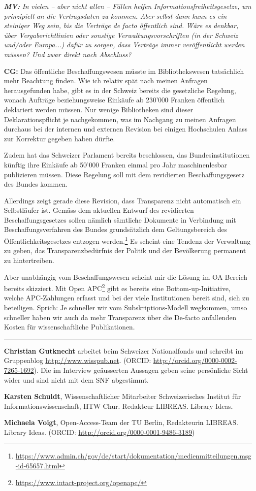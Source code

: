 \documentclass[a4paper,
fontsize=11pt,
oneside,
numbers=noperiodatend,
parskip=half-,
bibliography=totoc,
final
]{scrartcl}
\begin{document}
\emph{\textbf{MV:} In vielen -- aber nicht allen -- Fällen helfen
Informationsfreiheitsgesetze, um prinzipiell an die Vertragsdaten zu
kommen. Aber selbst dann kann es ein steiniger Weg sein, bis die
Verträge de facto öffentlich sind. Wäre es denkbar, über
Vergaberichtlinien oder sonstige Verwaltungsvorschriften (in der Schweiz
und/oder Europa...) dafür zu sorgen, dass Verträge immer veröffentlicht
werden müssen? Und zwar direkt nach Abschluss?}

\textbf{CG:} Das öffentliche Beschaffungswesen müsste im
Bibliothekswesen tatsächlich mehr Beachtung finden. Wie ich relativ spät
nach meinen Anfragen herausgefunden habe, gibt es in der Schweiz bereits
die gesetzliche Regelung, wonach Aufträge beziehungsweise Einkäufe ab
230'000 Franken öffentlich deklariert werden müssen. Nur wenige
Bibliotheken sind dieser Deklarationspflicht je nachgekommen, was im
Nachgang zu meinen Anfragen durchaus bei der internen und externen
Revision bei einigen Hochschulen Anlass zur Korrektur gegeben haben
dürfte.

Zudem hat das Schweizer Parlament bereits beschlossen, das
Bundesinstitutionen künftig ihre Einkäufe ab 50'000 Franken einmal pro
Jahr maschinenlesbar publizieren müssen. Diese Regelung soll mit dem
revidierten Beschaffungsgesetz des Bundes kommen.

Allerdings zeigt gerade diese Revision, dass Transparenz nicht
automatisch ein Selbstläufer ist. Gemäss dem aktuellen Entwurf des
revidierten Beschaffungsgesetzes sollen nämlich sämtliche Dokumente in
Verbindung mit Beschaffungsverfahren des Bundes grundsätzlich dem
Geltungsbereich des Öffentlichkeitsgesetzes entzogen werden.\footnote{\url{https://www.admin.ch/gov/de/start/dokumentation/medienmitteilungen.msg-id-65657.html}}
Es scheint eine Tendenz der Verwaltung zu geben, das
Transparenzbedürfnis der Politik und der Bevölkerung permanent zu
hintertreiben.

Aber unabhängig vom Beschaffungswesen scheint mir die Lösung im
OA-Bereich bereits skizziert. Mit Open APC\footnote{\url{https://www.intact-project.org/openapc/}}
gibt es bereits eine Bottom-up-Initiative, welche APC-Zahlungen erfasst
und bei der viele Institutionen bereit sind, sich zu beteiligen. Sprich:
Je schneller wir vom Subskriptions-Modell wegkommen, umso schneller
haben wir auch da mehr Transparenz über die De-facto anfallenden Kosten
für wissenschaftliche Publikationen.

\begin{center}\rule{0.5\linewidth}{\linethickness}\end{center}

\textbf{Christian Gutknecht} arbeitet beim Schweizer Nationalfonds und
schreibt im Gruppenblog \url{http://www.wisspub.net}. (ORCID:
\url{http://orcid.org/0000-0002-7265-1692}). Die im Interview
geäusserten Aussagen geben seine persönliche Sicht wider und sind nicht
mit dem SNF abgestimmt.

\textbf{Karsten Schuldt}, Wissenschaftlicher Mitarbeiter Schweizerisches
Institut für Informationswissenschaft, HTW Chur. Redakteur LIBREAS.
Library Ideas.

\textbf{Michaela Voigt}, Open-Access-Team der TU Berlin, Redakteurin
LIBREAS. Library Ideas. (ORCID:
\url{http://orcid.org/0000-0001-9486-3189})
\end{document}
